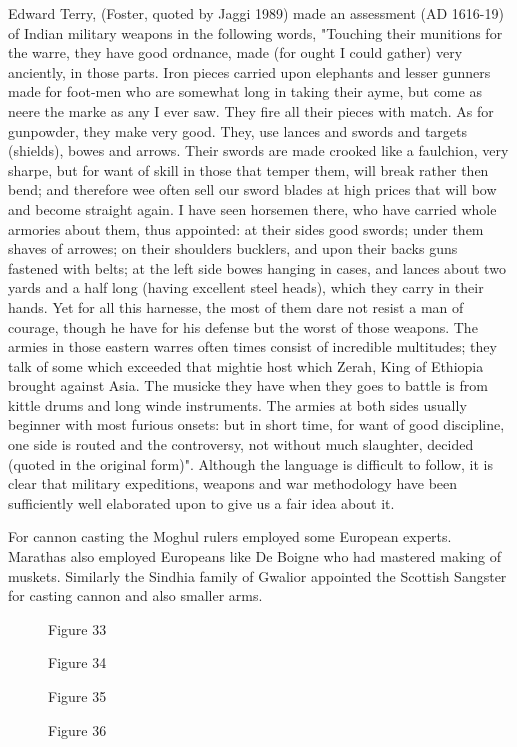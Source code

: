 Edward Terry, (Foster, quoted by Jaggi 1989) made an assessment (AD 1616-19) of Indian military weapons in the following words, "Touching their munitions for the warre, they have good ordnance, made (for ought I could gather) very anciently, in those parts. Iron pieces carried upon elephants and lesser gunners made for foot-men who are somewhat long in taking their ayme, but come as neere the marke as any I ever saw. They fire all their pieces with match. As for gunpowder, they make very good. They, use lances and swords and targets (shields), bowes and arrows. Their swords are made crooked like a faulchion, very sharpe, but for want of skill in those that temper them, will break rather then bend; and therefore wee often sell our sword blades at high prices that will bow and become straight again. I have seen horsemen there, who have carried whole armories about them, thus appointed: at their sides good swords; under them shaves of arrowes; on their shoulders bucklers, and upon their backs guns fastened with belts; at the left side bowes hanging in cases, and lances about two yards and a half long (having excellent steel heads), which they carry in their hands. Yet for all this harnesse, the most of them dare not resist a man of courage, though he have for his defense but the worst of those weapons. The armies in those eastern warres often times consist of incre­dible multitudes; they talk of some which exceeded that mightie host which Zerah, King of Ethiopia brought against Asia. The musicke they have when they goes to battle is from kittle drums and long winde instruments. The armies at both sides usually beginner with most furious onsets: but in short time, for want of good discipline, one side is routed and the controversy, not without much slaughter, decided (quoted in the original form)".  Although the language is difficult to follow, it is clear that military expeditions, weapons and war methodology have been sufficiently well elaborated upon to give us a fair idea about it.

For cannon casting the Moghul rulers employed some European experts. Marathas also employed Europeans like De Boigne who had mastered making of muskets. Similarly the Sindhia family of Gwalior appointed the Scottish Sangster for casting cannon and also smaller arms.
\begin{figure}[H]
\centerline{Figure 33}
\end{figure}
\begin{figure}[H]
\centerline{Figure 34}
\end{figure}
\begin{figure}[H]
\centerline{Figure 35}
\end{figure}
\begin{figure}[H]
\centerline{Figure 36}
\end{figure}


